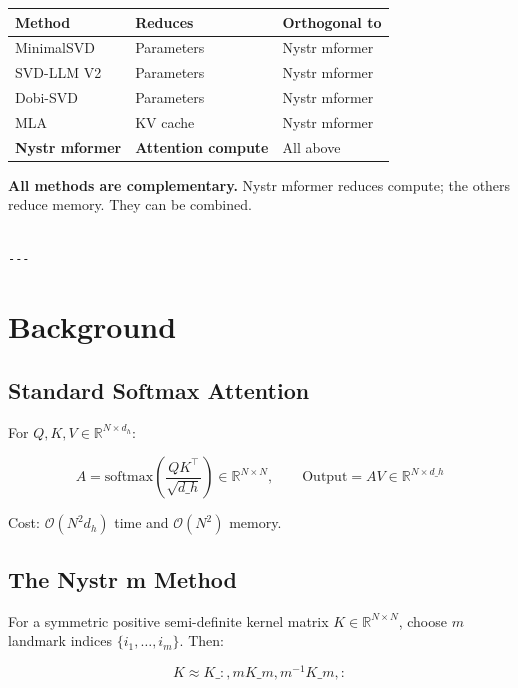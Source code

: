 \begin{table}[H]
\centering
\small
\begin{tabular}{lll}
\toprule
\textbf{Method} & \textbf{Reduces} & \textbf{Orthogonal to} \\
\midrule
MinimalSVD & Parameters & Nystr mformer \\
SVD-LLM V2 & Parameters & Nystr mformer \\
Dobi-SVD & Parameters & Nystr mformer \\
MLA & KV cache & Nystr mformer \\
\textbf{Nystr mformer} & \textbf{Attention compute} & All above \\
\bottomrule
\end{tabular}
\end{table}

\textbf{All methods are complementary.} Nystr mformer reduces compute; the others 
reduce memory. They can be combined.
\begin{lstlisting}

---
\end{lstlisting}


\section{Background}

\subsection{Standard Softmax Attention}

For $Q, K, V \in \mathbb{R}^{N \times d_h}$:

\[
A = \mathrm{softmax}\!\left(\frac{Q K^\top}{\sqrt{d\_h}}\right) \in \mathbb{R}^{N \times N}, \qquad
\text{Output} = A V \in \mathbb{R}^{N \times d\_h}
\tag{3.1}
\]

Cost: $\mathcal{O}(N^2 d_h)$ time and $\mathcal{O}(N^2)$ memory.

\subsection{The Nystr m Method}

For a symmetric positive semi-definite kernel matrix $K \in \mathbb{R}^{N \times N}$, 
choose $m$ landmark indices $\{i_1, \dots, i_m\}$. Then:

\[
K \approx K\_{:, m} K\_{m, m}^{-1} K\_{m, :}
\tag{3.2}
\]

